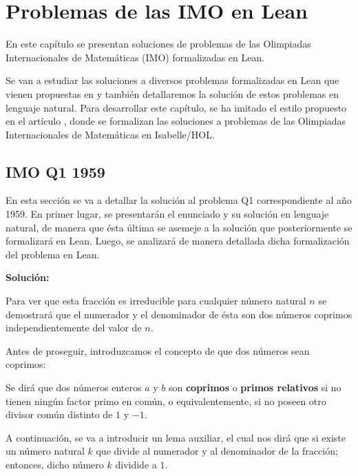 \chapter{Problemas de las IMO en Lean}

En este capítulo se presentan soluciones de problemas de las Olimpiadas
Internacionales de Matemáticas (IMO) formalizadas en Lean.

Se van a estudiar las soluciones a diversos problemas formalizadas en
Lean que vienen propuestas en \cite{IM} y también detallaremos la solución
de estos problemas en lenguaje natural. Para desarrollar este capítulo,
se ha imitado el estilo propuesto en el artículo \cite{ART}, donde se
formalizan las soluciones a problemas de las Olimpiadas Internacionales
de Matemáticas en Isabelle/HOL.

\section{IMO Q1 1959}
En esta sección se va a detallar la solución al problema Q1 correspondiente
al año 1959. En primer lugar, se presentarán el enunciado y su solución
en lenguaje natural, de manera que ésta última se asemeje a la solución
que posteriormente se formalizará en Lean. Luego, se analizará de manera
detallada dicha formalización del problema en Lean.

\noindent
{}

\textbf{Solución:}

Para ver que esta fracción es irreducible para cualquier número natural
\(n\) se demostrará que el numerador y el denominador de ésta son dos
números coprimos independientemente del valor de \(n\).

Antes de proseguir, introduzcamos el concepto de que dos números sean
coprimos:

\begin{definicion}\label{coprimos}
  Se dirá que dos números enteros \(a\) y \(b\) son \textbf{coprimos}
  o \textbf{primos relativos} si no tienen ningún factor primo en común,
  o equivalentemente, si no poseen otro divisor común distinto de \(1\)
  y \(-1\).
\end{definicion}

A continuación, se va a introducir un lema auxiliar, el cual nos dirá
que si existe un número natural \(k\) que divide al numerador y al
denominador de la fracción; entonces, dicho número \(k\) dividide
a \(1\).

